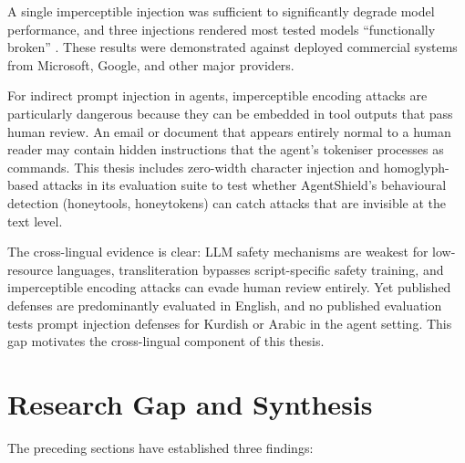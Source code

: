 \begin{justify}
A single imperceptible injection was sufficient to significantly degrade model performance, and three injections rendered most tested models ``functionally broken'' \citep{boucher2022bad}.  These results were demonstrated against deployed commercial systems from Microsoft, Google, and other major providers.
\end{justify}

\begin{justify}
For indirect prompt injection in agents, imperceptible encoding attacks are particularly dangerous because they can be embedded in tool outputs that pass human review.  An email or document that appears entirely normal to a human reader may contain hidden instructions that the agent's tokeniser processes as commands.  This thesis includes zero-width character injection and homoglyph-based attacks in its evaluation suite to test whether AgentShield's behavioural detection (honeytools, honeytokens) can catch attacks that are invisible at the text level.
\end{justify}

\begin{justify}
The cross-lingual evidence is clear: LLM safety mechanisms are weakest for low-resource languages, transliteration bypasses script-specific safety training, and imperceptible encoding attacks can evade human review entirely.  Yet published defenses are predominantly evaluated in English, and no published evaluation tests prompt injection defenses for Kurdish or Arabic in the agent setting.  This gap motivates the cross-lingual component of this thesis.
\end{justify}


\section{Research Gap and Synthesis}
\label{sec:research_gap}

\begin{justify}
The preceding sections have established three findings:
\end{justify}

